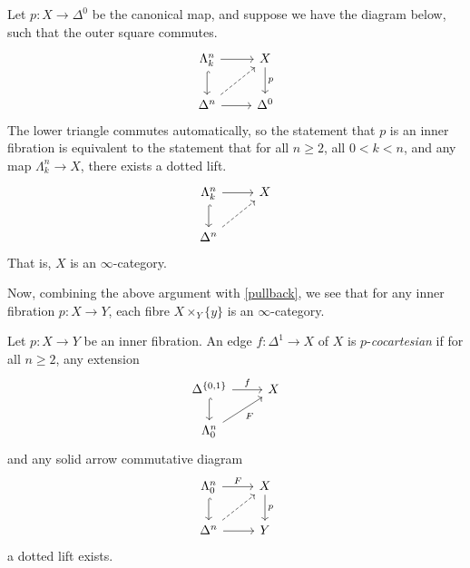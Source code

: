 \documentclass{MetricNotes2023}
\begin{document}

\begin{example}
Let \(p : X \to \Delta^0\) be the canonical map, and suppose we have the diagram below, such that the outer square commutes. 
\[\begin{tikzcd}
\Lambda^n_k \arrow[r, ""] \arrow[d, hookrightarrow, swap, ""]  & X \arrow[d, "p"]  \\
\Delta^n \arrow[r, swap, ""] \arrow[ur, dashrightarrow, swap, ""]  & \Delta^0
\end{tikzcd}\]
The lower triangle commutes automatically, so the statement that \(p\) is an inner fibration is equivalent to the statement that for all \(n \geq 2\), all \(0 < k < n\), and any map \(\Lambda^n_k \to X\), there exists a dotted lift.
\[\begin{tikzcd}
\Lambda^n_k \arrow[r, ""] \arrow[d, hookrightarrow, swap, ""]  & X  \\
\Delta^n \arrow[ur, dashrightarrow, swap, ""]  & 
\end{tikzcd}\]
That is, \(X\) is an \(\infty\)-category.

Now, combining the above argument with \ref{pullback}, we see that for any inner fibration \(p : X \to Y\), each fibre \(X\times_Y \{y\}\) is an \(\infty\)-category. 
\end{example}

\begin{definition}
Let \(p : X \to Y\) be an inner fibration. An edge \(f : \Delta^1 \to X\) of \(X\) is \(p\)-\textit{cocartesian} if for all \(n \geq 2\), any extension 
\[\begin{tikzcd}
\Delta^{\{0, 1\}} \arrow[r, "f"] \arrow[d, hookrightarrow, swap, ""]  & X \\
\Lambda^n_0 \arrow[ur, swap, "F"]  & 
\end{tikzcd}\]
and any solid arrow commutative diagram
\[\begin{tikzcd}
\Lambda^n_0 \arrow[r, "F"] \arrow[d, hookrightarrow, swap, ""]  & X \arrow[d, "p"]  \\
\Delta^n \arrow[r, swap, ""] \arrow[ur, dashrightarrow, ""]  & Y
\end{tikzcd}\]
a dotted lift exists. 
\end{definition}
\end{document}
